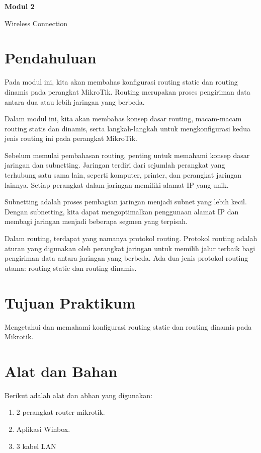\newpage
\setcounter{section}{0}
\renewcommand{\thesection}{\arabic{section}}

\begin{center}
    \Huge
    \textbf{Modul 2}
    
    Wireless Connection

\end{center}


\section{Pendahuluan}

Pada modul ini, kita akan membahas konfigurasi routing static dan routing dinamis pada perangkat
MikroTik. Routing merupakan proses pengiriman data antara dua atau lebih jaringan yang berbeda.

Dalam modul ini, kita akan membahas konsep dasar routing, macam-macam routing statis dan
dinamis, serta langkah-langkah untuk mengkonfigurasi kedua jenis routing ini pada perangkat
MikroTik.

Sebelum memulai pembahasan routing, penting untuk memahami konsep dasar jaringan dan
subnetting. Jaringan terdiri dari sejumlah perangkat yang terhubung satu sama lain, seperti komputer,
printer, dan perangkat jaringan lainnya. Setiap perangkat dalam jaringan memiliki alamat IP yang
unik.

Subnetting adalah proses pembagian jaringan menjadi subnet yang lebih kecil. Dengan subnetting, kita
dapat mengoptimalkan penggunaan alamat IP dan membagi jaringan menjadi beberapa segmen yang
terpisah.

Dalam routing, terdapat yang namanya protokol routing. Protokol routing adalah aturan yang
digunakan oleh perangkat jaringan untuk memilih jalur terbaik bagi pengiriman data antara jaringan
yang berbeda. Ada dua jenis protokol routing utama: routing static dan routing dinamis.

\section{Tujuan Praktikum}

Mengetahui dan memahami konfigurasi routing static dan routing dinamis pada Mikrotik.

\section{Alat dan Bahan}

Berikut adalah alat dan abhan yang digunakan:
\begin{enumerate}
    \item 2 perangkat router mikrotik.
    \item Aplikasi Winbox.
    \item 3 kabel LAN
\end{enumerate}

